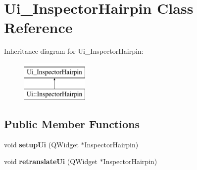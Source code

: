 \hypertarget{class_ui___inspector_hairpin}{}\section{Ui\+\_\+\+Inspector\+Hairpin Class Reference}
\label{class_ui___inspector_hairpin}
Inheritance diagram for Ui\+\_\+\+Inspector\+Hairpin\+:\begin{figure}[H]
\begin{center}
\leavevmode
\includegraphics[height=2.000000cm]{class_ui___inspector_hairpin}
\end{center}
\end{figure}
\subsection*{Public Member Functions}
\begin{DoxyCompactItemize}
\item 
\mbox{\label{class_ui___inspector_hairpin_adfa2f13a1850e0fb8e7077f8a1501797}} 
void {\bfseries setup\+Ui} (Q\+Widget $\ast$Inspector\+Hairpin)
\item 
\mbox{\label{class_ui___inspector_hairpin_a2b65bf526345610661c2ca6555a753cf}} 
void {\bfseries retranslate\+Ui} (Q\+Widget $\ast$Inspector\+Hairpin)
\end{DoxyCompactItemize}
